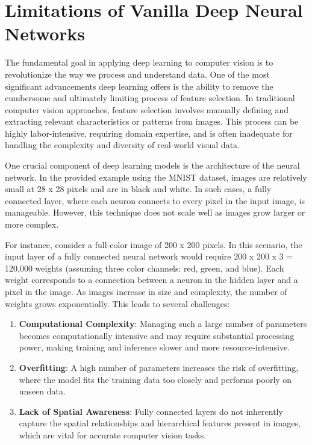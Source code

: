 \documentclass{report}
\begin{document}
\section{Limitations of Vanilla Deep Neural Networks}

The fundamental goal in applying deep learning to computer vision is to revolutionize the way we process and understand data. One of the most significant advancements deep learning offers is the ability to remove the cumbersome and ultimately limiting process of feature selection. In traditional computer vision approaches, feature selection involves manually defining and extracting relevant characteristics or patterns from images. This process can be highly labor-intensive, requiring domain expertise, and is often inadequate for handling the complexity and diversity of real-world visual data.


One crucial component of deep learning models is the architecture of the neural network. In the provided example using the MNIST dataset, images are relatively small at 28 x 28 pixels and are in black and white. In such cases, a fully connected layer, where each neuron connects to every pixel in the input image, is manageable. However, this technique does not scale well as images grow larger or more complex.

For instance, consider a full-color image of 200 x 200 pixels. In this scenario, the input layer of a fully connected neural network would require 200 x 200 x 3 = 120,000 weights (assuming three color channels: red, green, and blue). Each weight corresponds to a connection between a neuron in the hidden layer and a pixel in the image. As images increase in size and complexity, the number of weights grows exponentially. This leads to several challenges:

\begin{enumerate}
	\item \textbf{Computational Complexity}: Managing such a large number of parameters becomes computationally intensive and may require substantial processing power, making training and inference slower and more resource-intensive.

	\item \textbf{Overfitting}: A high number of parameters increases the risk of overfitting, where the model fits the training data too closely and performs poorly on unseen data.

	\item \textbf{Lack of Spatial Awareness}: Fully connected layers do not inherently capture the spatial relationships and hierarchical features present in images, which are vital for accurate computer vision tasks.
\end{enumerate}
\end{document}
